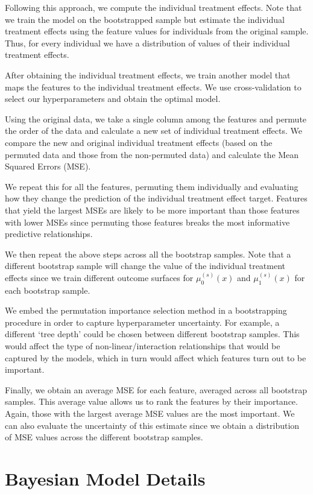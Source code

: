 \documentclass[12pt, a4paper]{article}
\begin{document}
Following this approach, we compute the individual treatment effects. Note that we train the model on the bootstrapped sample but estimate the individual
treatment effects using the feature values for individuals from the original
sample. Thus, for every individual we have a distribution of values of their
individual treatment effects.

After obtaining the individual treatment effects, we train another model that
maps the features to the individual treatment effects. We use cross-validation
to select our hyperparameters and obtain the optimal model. 

Using the original data, we take a single column among the features and
permute the order of the data and calculate a new set of individual treatment
effects. We compare the new and original individual treatment effects (based on
the permuted data and those from the non-permuted data) and calculate the Mean
Squared Errors (MSE). 

We repeat this for all the features, permuting them individually and evaluating
how they change the prediction of the individual treatment effect target.
Features that yield the largest MSEs are likely to be more important than those
features with lower MSEs since permuting those features breaks the
most informative predictive relationships. 

We then repeat the above steps across all the bootstrap samples. Note that a
different bootstrap sample will change the value of the individual treatment
effects since we train different outcome surfaces for $\mu^{(s)}_0(x)$ and
$\mu^{(s)}_1(x)$ for each bootstrap sample.

We embed the permutation importance selection method in a bootstrapping
procedure in order to capture hyperparameter uncertainty. For example, a
different `tree depth' could be chosen between different bootstrap samples.
This would affect the type of non-linear/interaction relationships that would
be captured by the models, which in turn would affect which features turn out
to be important. 

Finally, we obtain an average MSE for each feature, averaged across all
bootstrap samples. This average value allows us to rank the features by their
importance. Again, those with the largest average MSE values are the most
important. We can also evaluate the uncertainty of this estimate since we
obtain a distribution of MSE values across the different bootstrap samples.

\section{Bayesian Model Details}
\label{app:bayes}
\end{document}

